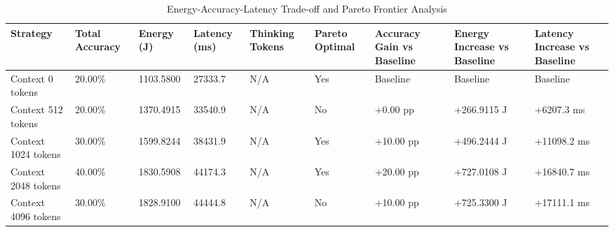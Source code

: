 \begin{table}
\caption{Energy-Accuracy-Latency Trade-off and Pareto Frontier Analysis}
\label{tab:tradeoff_comparison}
\begin{tabular}{lllllllll}
\toprule
Strategy & Total Accuracy & Energy (J) & Latency (ms) & Thinking Tokens & Pareto Optimal & Accuracy Gain vs Baseline & Energy Increase vs Baseline & Latency Increase vs Baseline \\
\midrule
Context 0 tokens & 20.00\% & 1103.5800 & 27333.7 & N/A & Yes & Baseline & Baseline & Baseline \\
Context 512 tokens & 20.00\% & 1370.4915 & 33540.9 & N/A & No & +0.00 pp & +266.9115 J & +6207.3 ms \\
Context 1024 tokens & 30.00\% & 1599.8244 & 38431.9 & N/A & Yes & +10.00 pp & +496.2444 J & +11098.2 ms \\
Context 2048 tokens & 40.00\% & 1830.5908 & 44174.3 & N/A & Yes & +20.00 pp & +727.0108 J & +16840.7 ms \\
Context 4096 tokens & 30.00\% & 1828.9100 & 44444.8 & N/A & No & +10.00 pp & +725.3300 J & +17111.1 ms \\
\bottomrule
\end{tabular}
\end{table}
